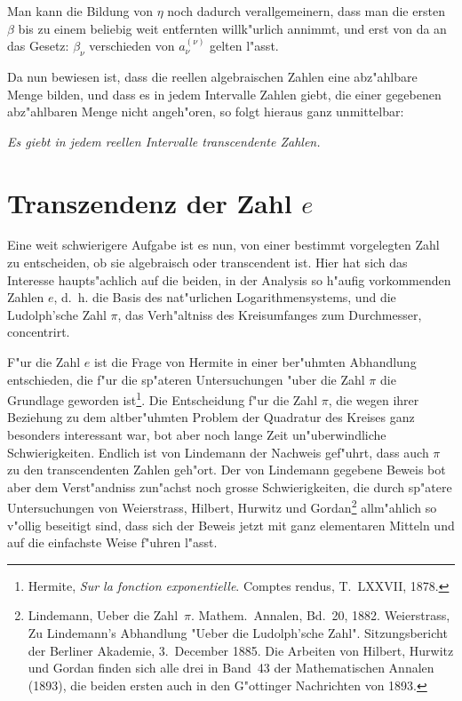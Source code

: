 \documentclass[10pt,a4paper]{article}
\theoremstyle{weberstyle}
\begin{document}
Man kann die Bildung von $\eta$ noch dadurch verallgemeinern, dass man die
ersten $\beta$ bis zu einem beliebig weit entfernten willk"urlich annimmt,
und erst von da an das Gesetz: $\beta_\nu$ verschieden von
$a_\nu^{(\nu)}$ gelten l"asst.

Da nun bewiesen ist, dass die reellen algebraischen Zahlen eine abz"ahlbare
Menge bilden, und dass es in jedem Intervalle Zahlen giebt, die einer
gegebenen abz"ahlbaren Menge nicht angeh"oren, so folgt hieraus ganz
unmittelbar:

\begin{center}
\textit{Es giebt in jedem reellen Intervalle transcendente Zahlen.}
\end{center}

\newpage

%
%
\section{Transzendenz der Zahl $e$}\label{sec:205}

Eine weit schwierigere Aufgabe ist es nun, von einer bestimmt vorgelegten
Zahl zu entscheiden, ob sie algebraisch oder transcendent ist. Hier hat
sich das Interesse haupts"achlich auf die beiden, in der Analysis so
h"aufig vorkommenden Zahlen $e$, d.~h. die Basis des nat"urlichen
Logarithmensystems, und die Ludolph'sche Zahl $\pi$, das Verh"altniss des
Kreisumfanges zum Durchmesser, concentrirt.

F"ur die Zahl $e$ ist die Frage von Hermite in einer ber"uhmten
Abhandlung entschieden, die f"ur die sp"ateren Untersuchungen "uber die
Zahl $\pi$ die Grundlage geworden ist\footnote{Hermite, \textit{Sur la
fonction exponentielle}. Comptes rendus, T.~LXXVII, 1878.}. Die
Entscheidung f"ur die Zahl $\pi$, die wegen ihrer Beziehung zu dem
altber"uhmten Problem der Quadratur des Kreises ganz besonders interessant
war, bot aber noch lange Zeit un"uberwindliche Schwierigkeiten. Endlich
ist von Lindemann der Nachweis gef"uhrt, dass auch $\pi$ zu den
transcendenten Zahlen geh"ort. Der von Lindemann gegebene Beweis bot aber
dem Verst"andniss zun"achst noch grosse Schwierigkeiten, die durch
sp"atere Untersuchungen von Weierstrass, Hilbert, Hurwitz und
Gordan\footnote{Lindemann, Ueber die Zahl~$\pi$. Mathem.~Annalen, Bd.~20,
1882. Weierstrass, Zu Lindemann's Abhandlung "Ueber die Ludolph'sche
Zahl". Sitzungsbericht der Berliner Akademie, 3.~December 1885. Die
Arbeiten von Hilbert, Hurwitz und Gordan finden sich alle drei in Band~43
der Mathematischen Annalen (1893), die beiden ersten auch in den
G"ottinger Nachrichten von 1893.} allm"ahlich so v"ollig beseitigt sind,
dass sich der Beweis jetzt mit ganz elementaren Mitteln und auf die
einfachste Weise f"uhren l"asst.
\end{document}
